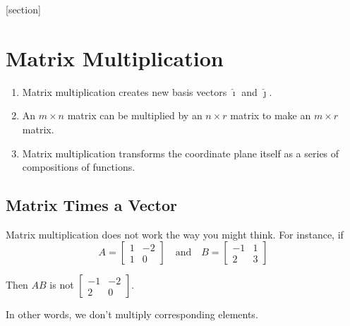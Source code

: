 \documentclass{article}
\begin{document}
[section]
\newenvironment{example}[1][]{\refstepcounter{example}\par\medskip
   {\color{red}\textbf{Example~\theexample. #1}}}{\medskip}


\section*{Matrix Multiplication}

\begin{tcolorbox}[colframe=orange!70!white, coltitle=black, colback = white, title=\textbf{Summary}]
\begin{enumerate}
    \item Matrix multiplication creates new basis vectors $\hat{\imath}$ and $\hat{\jmath}$.
    \item An $m \times n$ matrix can be multiplied by an $n \times r$ matrix to make an $m \times r$ matrix.
    \item Matrix multiplication transforms the coordinate plane itself as a series of compositions of functions.
\end{enumerate}
\end{tcolorbox}

\subsection*{Matrix Times a Vector}

Matrix multiplication does not work the way you might think. For instance, if 
\[ 
A = 
\begin{bmatrix} 
    1 & -2 \\ 
    1 & 0 
\end{bmatrix} \quad \text{and} \quad 
B = 
\begin{bmatrix} 
    -1 & 1 \\ 
    2 & 3 
\end{bmatrix}
\]
\bigskip 

Then $AB$ is not 
$\begin{bmatrix} 
    -1 & -2 \\ 
    2 & 0 
\end{bmatrix}$. 
\bigskip

In other words, we don't multiply corresponding elements.	\bigskip 

\bigskip 
\end{document}

